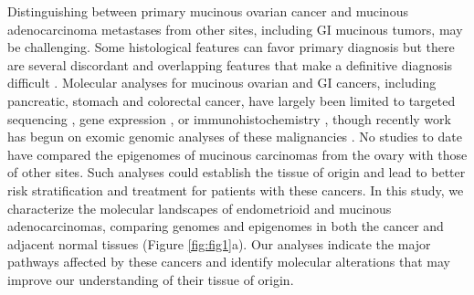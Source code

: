 Distinguishing between primary mucinous ovarian cancer and mucinous adenocarcinoma metastases from other sites, including GI mucinous tumors, may be challenging.
Some histological features can favor primary diagnosis but there are several discordant and overlapping features that make a definitive diagnosis difficult \cite{brown2014}.
Molecular analyses for mucinous ovarian and GI cancers, including pancreatic, stomach and colorectal cancer, have largely been limited to targeted sequencing \cite{lee2017, khan2018, nakata2002, cheasley2019, dundr2023}, gene expression \cite{elias2018}, or immunohistochemistry \cite{elias2014}, though recently work has begun on exomic genomic analyses of these malignancies \cite{cheasley2019, mueller2018}.
No studies to date have compared the epigenomes of mucinous carcinomas from the ovary with those of other sites.
Such analyses could establish the tissue of origin and lead to better risk stratification and treatment for patients with these cancers.
In this study, we characterize the molecular landscapes of endometrioid and mucinous adenocarcinomas, comparing genomes and epigenomes in both the cancer and adjacent normal tissues (Figure \ref{fig:fig1}a).
Our analyses indicate the major pathways affected by these cancers and identify molecular alterations that may improve our understanding of their tissue of origin.